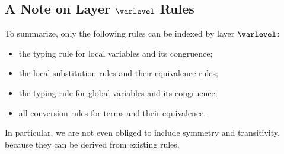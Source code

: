 \subsection{A Note on Layer $\varlevel$ Rules}

To summarize, only the following rules can be indexed by layer $\varlevel$:
\begin{itemize}
\item the typing rule for local variables and its congruence;
\item the local substitution rules and their equivalence rules;
\item the typing rule for global variables and its congruence;
\item all conversion rules for terms and their equivalence.
\end{itemize}
In particular, we are not even obliged to include symmetry and transitivity, because
they can be derived from existing rules.
